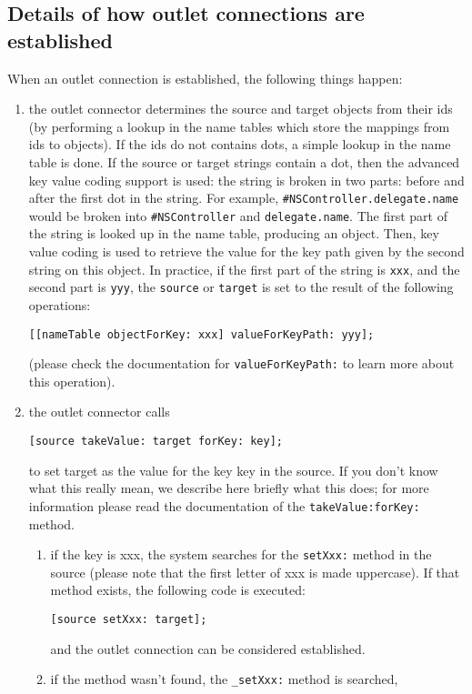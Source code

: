 \subsection{Details of how outlet connections are established}
When an outlet connection is established, the following things happen:
\begin{enumerate}
\item the outlet connector determines the source and target objects 
from their ids (by performing a lookup in the name tables which store
the mappings from ids to objects).  If the ids do not contains dots, a
simple lookup in the name table is done.  If the source or target
strings contain a dot, then the advanced key value coding support is
used: the string is broken in two parts: before and after the first
dot in the string.  For example, \texttt{\#NSController.delegate.name}
would be broken into \texttt{\#NSController} and
\texttt{delegate.name}.  The first part of the string is looked up in
the name table, producing an object.  Then, key value coding is used
to retrieve the value for the key path given by the second string on
this object.  In practice, if the first part of the string is
\texttt{xxx}, and the second part is \texttt{yyy}, the
\texttt{source} or \texttt{target} is set to the result of the following
operations:
\begin{verbatim}
[[nameTable objectForKey: xxx] valueForKeyPath: yyy];
\end{verbatim}
(please check the documentation for \texttt{valueForKeyPath:} to learn
more about this operation).
\item the outlet connector calls
\begin{verbatim}
[source takeValue: target forKey: key];
\end{verbatim}
to set target as the value for the key key in the source.  If you
don't know what this really mean, we describe here briefly what this
does; for more information please read the documentation of the
\texttt{takeValue:forKey:} method.
\begin{enumerate}
\item if the key is xxx, the system searches for the \texttt{setXxx:}
method in the source (please note that the first letter of xxx is made
uppercase).  If that method exists, the following code is executed:
\begin{verbatim}
[source setXxx: target];
\end{verbatim}
and the outlet connection can be considered established.
\item if the method wasn't found, the \texttt{\_setXxx:} method is searched,

\end{enumerate}
\end{enumerate}
